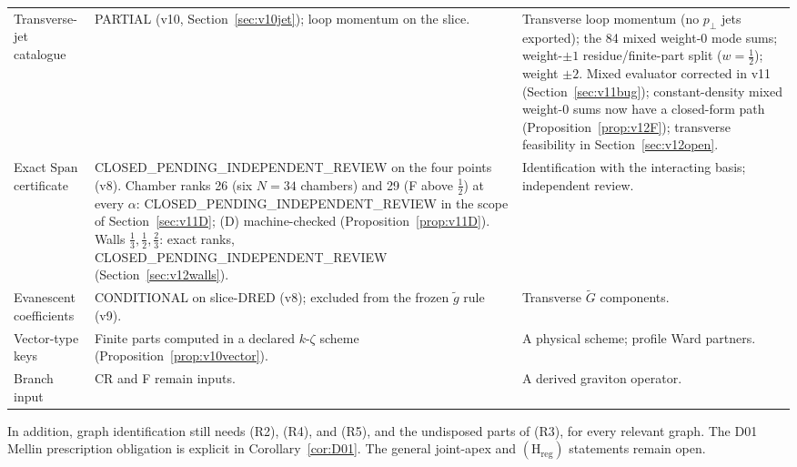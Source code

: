 \documentclass[11pt,a4paper]{article}
\newcommand{\CONDITIONAL}{\textsf{CONDITIONAL}}
\newcommand{\PARTIAL}{\textsf{PARTIAL}}
\newcommand{\CPIR}{\textsf{CLOSED\_PENDING\_}\allowbreak\textsf{INDEPENDENT\_REVIEW}}
\newcommand{\Span}{\mathrm{Span}}
\newcommand{\Hreg}{(\mathrm H_{\mathrm{reg}})}
\theoremstyle{plain}
\theoremstyle{definition}
\theoremstyle{remark}
\numberwithin{equation}{section}
\begin{document}
\begin{longtable}{@{}L{.22\linewidth}L{.40\linewidth}L{.31\linewidth}@{}}
Transverse-jet catalogue &
\PARTIAL{} (v10, Section~\ref{sec:v10jet}); loop momentum on the
slice. &
Transverse loop momentum (no \(p_\perp\) jets exported); the 84 mixed
weight-0 mode sums; weight-\(\pm1\) residue/finite-part split
(\(w=\tfrac12\)); weight \(\pm2\). Mixed evaluator corrected in v11
(Section~\ref{sec:v11bug}); constant-density mixed weight-0 sums now have a
closed-form path (Proposition~\ref{prop:v12F}); transverse feasibility in
Section~\ref{sec:v12open}.\\

Exact \(\Span\) certificate &
\CPIR{} on the four points (v8). Chamber ranks 26 (six \(N=34\)
chambers) and 29 (F above \(\tfrac12\)) at every \(\alpha\):
\CPIR{} in the scope of Section~\ref{sec:v11D}; (D) machine-checked
(Proposition~\ref{prop:v11D}). Walls \(\tfrac13,\tfrac12,\tfrac23\): exact
ranks, \CPIR{} (Section~\ref{sec:v12walls}). &
Identification with the interacting basis; independent review.\\

Evanescent coefficients &
\CONDITIONAL{} on slice-DRED (v8); excluded from the frozen
\(\tilde g\) rule (v9). &
Transverse \(\tilde G\) components.\\

Vector-type keys &
Finite parts computed in a declared \(k\)-\(\zeta\) scheme
(Proposition~\ref{prop:v10vector}). &
A physical scheme; profile Ward partners.\\

Branch input &
CR and F remain inputs. &
A derived graviton operator.\\
\end{longtable}
\endgroup

In addition, graph identification still needs (R2), (R4), and
(R5), and the undisposed parts of (R3), for every relevant
graph. The D01 Mellin prescription obligation is explicit in
Corollary~\ref{cor:D01}.
The general joint-apex and \(\Hreg\) statements remain open.
\end{document}
